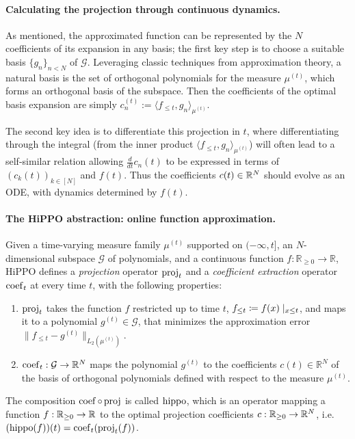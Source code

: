 \paragraph{Calculating the projection through continuous dynamics.}
As mentioned, the approximated function can be represented by the $N$ coefficients of its expansion in any basis;
the first key step is to choose a suitable basis $\{g_n\}_{n < N}$ of $\mathcal{G}$.
Leveraging classic techniques from approximation theory, a natural basis is the set of orthogonal polynomials for the measure $\mu^{(t)}$,
which forms an orthogonal basis of the subspace.
Then the coefficients of the optimal basis expansion are simply $c^{(t)}_n := \langle f_{\le t}, g_n \rangle_{\mu^{(t)}}$.

The second key idea is to differentiate this projection in $t$, where
differentiating through the integral (from the inner product
$\langle f_{\leq t},  g_n \rangle_{\mu^{(t)}}$) will often lead to a self-similar relation
allowing $\frac{d}{dt} c_n(t)$ to be expressed in terms of $(c_k(t))_{k\in [N]}$ and $f(t)$.
Thus the coefficients $c(t) \in \mathbb{R}^N$ should evolve as an ODE, with dynamics determined by $f(t)$.

\paragraph{The HiPPO abstraction: online function approximation.}
\begin{definition}%
    \label{def:hippo}
    Given a time-varying measure family $\mu^{(t)}$ supported on $(-\infty, t]$, an
    $N$-dimensional subspace $\mathcal{G}$ of polynomials, and a continuous
    function $f \colon \mathbb{R}_{\geq 0} \to \mathbb{R}$,
    HiPPO defines a \emph{projection} operator $\operatorname{proj}_t$ and a \emph{coefficient extraction} operator $\operatorname{coef}_t$ at every time $t$, with the following properties:
    \begin{enumerate}[label=(\arabic*), topsep=0em, partopsep=0.0em, itemsep=0em, parsep=0.1em, leftmargin=2em]
      \item $\operatorname{proj}_t$ takes the function $f$ restricted up to time $t$,
      $f_{\leq t} \coloneqq f(x) \mid_{x \leq t}$, and maps it to a
      polynomial $g^{(t)} \in \mathcal{G}$, that minimizes the approximation error $\|f_{\leq t} - g^{(t)}\|_{L_2(\mu^{(t)})}$.
        \item $\operatorname{coef}_t: \mathcal{G} \to \mathbb{R}^N$ maps the polynomial $g^{(t)}$
        to the coefficients $c(t) \in \mathbb{R}^N$ of the basis of orthogonal
        polynomials defined with respect to the measure $\mu^{(t)}$.
    \end{enumerate}
    The composition $\operatorname{coef} \circ \operatorname{proj}$ is called $\operatorname{hippo}$, which is an operator
    mapping a function $f: \mathbb{R}_{\geq 0} \to \mathbb{R}$ to the optimal projection coefficients
    $c: \mathbb{R}_{\geq 0} \to \mathbb{R}^N$, i.e.\ $(\operatorname{hippo}(f))(t) = \operatorname{coef}_t(\operatorname{proj}_t(f))$.
\end{definition}

